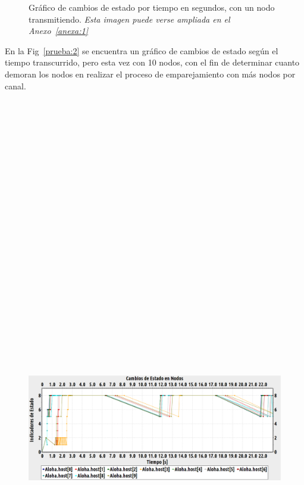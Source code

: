 \begin{justify}
\begin{figure}[!b]
\caption{Gráfico de cambios de estado por tiempo en segundos, con un nodo transmitiendo. \textit{Esta imagen puede verse ampliada en el Anexo~\ref{anexa:1}}}
\label{prueba:1}
\end{figure}
En la Fig~\ref{prueba:2} se encuentra un gráfico de cambios de estado según el tiempo transcurrido, pero esta vez con 10 nodos, con el fin de determinar cuanto demoran los nodos en realizar el proceso de emparejamiento con más nodos por canal.\\
\begin{figure}[!ht]
\centering
\includegraphics[width=13cm,height=30cm,keepaspectratio]{images/cambioestado10nodos.eps}

\end{figure}
\end{justify}
